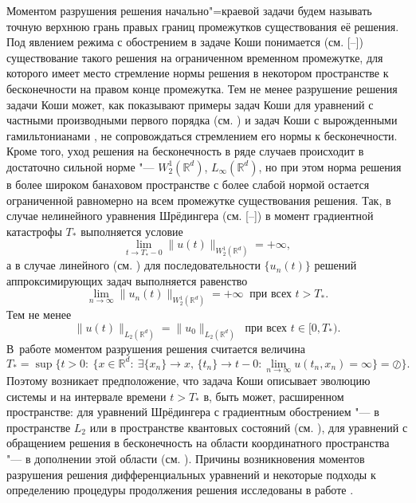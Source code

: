  Моментом разрушения решения начально"=краевой задачи будем называть
точную верхнюю грань правых границ промежутков существования её
решения.  Под явлением режима
с обострением в задаче Коши понимается (см. [--]) существование такого
решения на ограниченном временном промежутке, для которого имеет
место стремление нормы решения в некотором пространстве к
бесконечности на правом конце промежутка.
Тем не менее разрушение решения задачи
Коши может, как показывают примеры задач Коши для уравнений с
частными производными первого порядка (см.
\cite{Kruzh, OlRad}) и задач Коши с вырожденными гамильтонианами
\cite{SR11}, не сопровождаться стремлением его нормы к
бесконечности. Кроме того, уход решения на бесконечность в ряде
случаев происходит в достаточно сильной норме "---
$W^{1}_{2}(\mathbb R^{d})$, $L_{\infty}(\mathbb R^{d})$, но при этом норма решения
в более широком банаховом пространстве с более слабой нормой
остается ограниченной равномерно на всем промежутке существования
решения. Так, в случае нелинейного уравнения Шрёдингера (см.
[--]) в момент
градиентной катастрофы $T_{*}$ выполняется условие
$$\lim\limits_{t\to T_{*}-0}\|u(t)\|_{W^{1}_{2}(\mathbb R^{d})}=+\infty,$$ а в случае линейного (см. \cite{BG84, GK}) для последовательности $\{ u_n(t)\}$ решений аппроксимирующих задач выполняется равенство $$\lim\limits_{n\to \infty }\|u_n(t)\|_{W^{1}_{2}(\mathbb R^{d})}=+\infty ~ \text{ при всех $t>T_*$.} $$ 
Тем не менее
$$\|u(t)\|_{L_{2}(\mathbb R^{d})}=\|u_{0}\|_{L_{2}(\mathbb R^{d})}~ \text{ при всех $t\in
[0, T_{*})$.} $$ 
В~работе \cite{Miz} моментом разрушения решения
считается величина $$T_{*}=\sup\bigl\{ t>0: \ \{ x\in \mathbb R^{d}: \ \exists \{
x_{n}\}\to x,\, \{ t_{n}\}\to t-0:\lim\limits_{n\to \infty
}u(t_{n},x_{n})=\infty \}=\oslash \bigr\}.$$ Поэтому возникает
предположение, что задача Коши описывает эволюцию системы и на
интервале времени $t>T_{*}$ в, быть может, расширенном пространстве: для уравнений Шрёдингера с градиентным обострением "--- в пространстве $L_{2}$ или в пространстве квантовых состояний (см. \cite{SR11, STMF}), для уравнений с обращением
решения в бесконечность на области координатного пространства "--- в
дополнении этой области (см. \cite{GK, Miz, GalaktVazq}). Причины возникновения моментов разрушения решения дифференциальных уравнений и некоторые подходы к определению процедуры продолжения решения исследованы в работе \cite{puma}.

